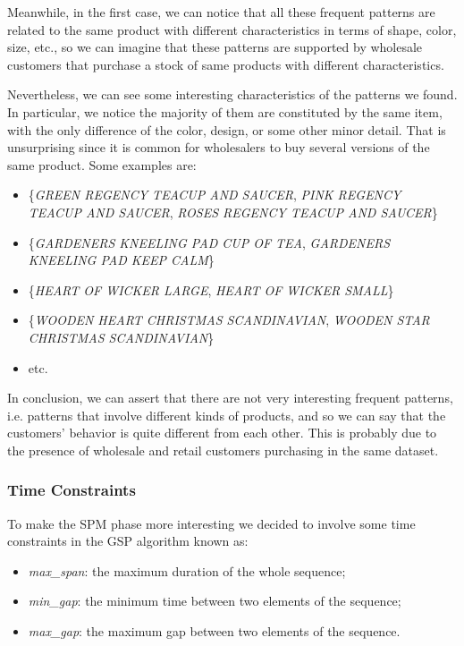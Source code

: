 Meanwhile, in the first case, we can notice that all these frequent patterns are related to the same product with different characteristics in terms of shape, color, size, etc., so we can imagine that these patterns are supported by wholesale customers that purchase a stock of same products with different characteristics.

Nevertheless, we can see some interesting characteristics of the patterns we found.\\
In particular, we notice the majority of them are constituted by the same item, with the only difference of the color, design, or some other minor detail. That is unsurprising since it is common for wholesalers to buy several versions of the same product. Some examples are:

\begin{itemize}
\item \{\emph{GREEN REGENCY TEACUP AND SAUCER}, \emph{PINK REGENCY TEACUP AND SAUCER}, \emph{ROSES REGENCY TEACUP AND SAUCER}\}
\item \{\emph{GARDENERS KNEELING PAD CUP OF TEA}, \emph{GARDENERS KNEELING PAD KEEP CALM}\}
\item \{\emph{HEART OF WICKER LARGE}, \emph{HEART OF WICKER SMALL}\}
\item \{\emph{WOODEN HEART CHRISTMAS SCANDINAVIAN}, \emph{WOODEN STAR CHRISTMAS SCANDINAVIAN}\}
\item etc.
\end{itemize}

In conclusion, we can assert that there are not very interesting frequent patterns, i.e. patterns that involve different kinds of products, and so we can say that the customers' behavior is quite different from each other. This is probably due to the presence of wholesale and retail customers purchasing in the same dataset.

\subsubsection{Time Constraints}
To make the SPM phase more interesting we decided to involve some time constraints in the GSP algorithm known as:

\begin{itemize}
\item \emph{max\_span}: the maximum duration of the whole sequence;
\item \emph{min\_gap}: the minimum time between two elements of the sequence;
\item \emph{max\_gap}: the maximum gap between two elements of the sequence.
\end{itemize}

